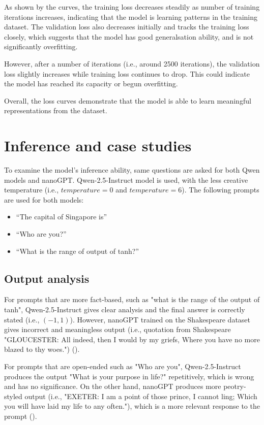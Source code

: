 \documentclass{article} %
\begin{document}
As shown by the curves, the training loss decreases steadily as number of training iterations increases, indicating that the model is learning patterns in the training dataset. The validation loss also decreases initially and tracks the training loss closely, which suggests that the model has good generalsation ability, and is not significantly overfitting.

However, after a number of iterations (i.e., around 2500 iterations), the validation loss slightly increases while training loss continues to drop. This could indicate the model has reached its capacity or begun overfitting. 

Overall, the loss curves demonstrate that the model is able to learn meaningful representations from the dataset.

\section{Inference and case studies}
To examine the model's inference ability, same questions are asked for both Qwen models and nanoGPT. Qwen-2.5-Instruct model is used, with the less creative temperature (i.e., $temperature = 0$ and $temperature = 6$). The following prompts are used for both models:
\begin{itemize}
    \item “The capital of Singapore is”
    \item “Who are you?”
    \item “What is the range of output of tanh?”
\end{itemize}

\subsection{Output analysis}
For prompts that are more fact-based, such as "what is the range of the output of tanh", Qwen-2.5-Instruct gives clear analysis and the final answer is correctly stated (i.e., $(-1, 1)$). However, nanoGPT trained on the Shakespeare dataset gives incorrect and meaningless output (i.e., quotation from Shakespeare "GLOUCESTER: All indeed, then I would by my griefs, Where you have no more blazed to thy woes.") (\cite{nanoGPT-vs-Qwen}).

For prompts that are open-ended such as "Who are you", Qwen-2.5-Instruct produces the output "What is your purpose in life?" repetitively, which is wrong and has no significance. On the other hand, nanoGPT produces more peotry-styled output (i.e., "EXETER: I am a point of those prince, I cannot ling; Which you will have laid my life to any often."), which is a more relevant response to the prompt (\cite{radford2018improving}). 
\end{document}
